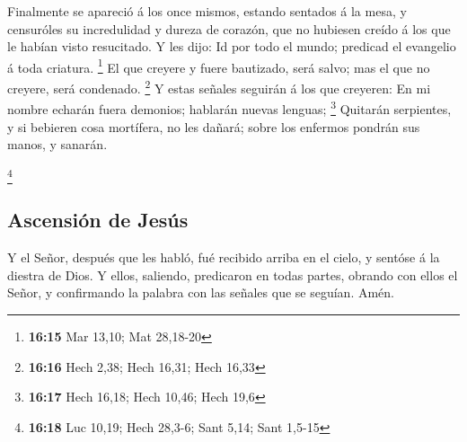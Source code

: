  Finalmente se apareció á los once mismos, estando
sentados á la mesa, y censuróles su incredulidad y dureza de corazón,
que no hubiesen creído á los que le habían visto resucitado.
 Y les dijo: Id por todo el mundo; predicad el evangelio
á toda criatura. \footnote{\textbf{16:15} Mar 13,10; Mat 28,18-20}
 El que creyere y fuere bautizado, será salvo; mas el que
no creyere, será condenado. \footnote{\textbf{16:16} Hech 2,38; Hech
  16,31; Hech 16,33}  Y estas señales seguirán á los que
creyeren: En mi nombre echarán fuera demonios; hablarán nuevas lenguas;
\footnote{\textbf{16:17} Hech 16,18; Hech 10,46; Hech 19,6}
 Quitarán serpientes, y si bebieren cosa mortífera, no
les dañará; sobre los enfermos pondrán sus manos, y sanarán.

\footnote{\textbf{16:18} Luc 10,19; Hech 28,3-6; Sant 5,14; Sant 1,5-15}

\hypertarget{ascensiuxf3n-de-jesuxfas}{%
\subsection{Ascensión de Jesús}\label{ascensiuxf3n-de-jesuxfas}}

 Y el Señor, después que les habló, fué recibido arriba
en el cielo, y sentóse á la diestra de Dios.  Y ellos,
saliendo, predicaron en todas partes, obrando con ellos el Señor, y
confirmando la palabra con las señales que se seguían. Amén.
